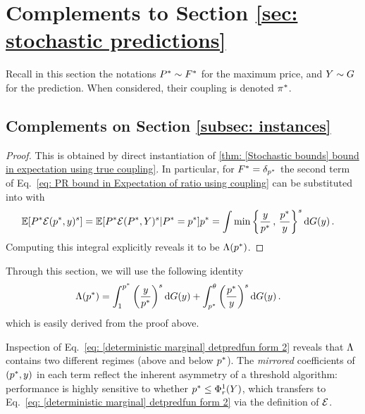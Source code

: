 \section{Complements to Section \ref{sec: stochastic predictions}}\label{app: sec3}

Recall in this section the notations $P^*\sim F^*$ for the maximum price, and $Y\sim G$ for the prediction. When considered, their coupling is denoted $\pi^*$. 

\subsection{Complements on Section \ref{subsec: instances}}


\DeterministicMarginalBounds*

\begin{proof}
    This is obtained by direct instantiation of \cref{thm: [Stochastic bounds] bound in expectation using true coupling}. In particular, for $F^*=\delta_{p^*}$ the second term of Eq.~\eqref{eq: PR bound in Expectation of ratio using coupling} can be substituted into with
    \begin{align}
        \mathbb{E}[P^*\mathcal{E}(p^*,y)^{s}]&=\mathbb{E}[P^*\mathcal{E}(P^*,Y)^{s}\vert P^*=p^*] p^*=\int \min\left\{\frac{y}{p^*}\,,\,\frac{p^*}{y} \right\}^{s}\mathrm{d}G(y)\,.\notag
    \end{align}
    Computing this integral explicitly reveals it to be $\Lambda(p^*)$.
\end{proof}

Through this section, we will use the following identity
\begin{align}
\Lambda(p^*)&=\int_1^{p^*}\left(\frac{y}{p^*}\right)^{s}\mathrm{d} G(y) + \int_{p^*}^\theta \left(\frac{p^*}{y}\right)^{s}\mathrm{d} G(y)\,.
\label{eq: [deterministic marginal] detpredfun form 2}
\end{align}
which is easily derived from the proof above.

Inspection of Eq.~\eqref{eq: [deterministic marginal] detpredfun form 2} reveals that $\Lambda$ contains two different regimes (above and below $p^*$). The \emph{mirrored} coefficients of $(p^*,y)$ in each term reflect the inherent asymmetry of a threshold algorithm: performance is highly sensitive to whether $p^*\le\Phi_r^1(Y)$, which transfers to Eq.~\eqref{eq: [deterministic marginal] detpredfun form 2} via the definition of $\mathcal{E}$. 


